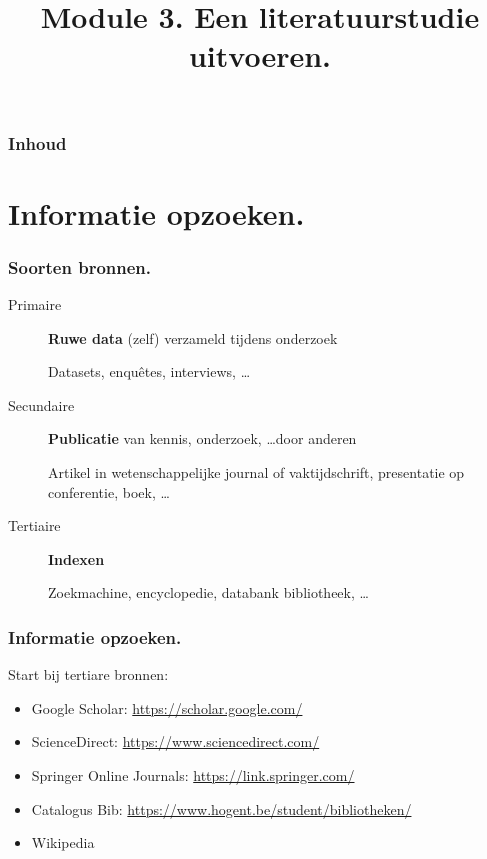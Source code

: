 \documentclass[aspectratio=169]{beamer}
\title{Module 3. Een literatuurstudie uitvoeren.}
\subtitle{\coursename}
\author{\lecturers}   %
\date{\academicyear}
\begin{document}
\begin{frame}
  \maketitle
\end{frame}

\begin{frame}
  \frametitle{Inhoud}

  \tableofcontents
\end{frame}

\section{Informatie opzoeken.}

\begin{frame}
  \frametitle{Soorten bronnen.}

  \begin{description}
    \item[Primaire] \textbf{Ruwe data} (zelf) verzameld tijdens onderzoek

      Datasets, enquêtes, interviews, \ldots

    \item[Secundaire] \textbf{Publicatie} van kennis, onderzoek, \ldots door anderen

      Artikel in wetenschappelijke journal of vaktijdschrift, presentatie op conferentie, boek, \ldots

    \item[Tertiaire] \textbf{Indexen}

      Zoekmachine, encyclopedie, databank bibliotheek, \ldots

  \end{description}

\end{frame}

\begin{frame}
  \frametitle{Informatie opzoeken.}

  Start bij \alert{tertiare} bronnen:

  \begin{itemize}
    \item Google Scholar: \url{https://scholar.google.com/}
    \item ScienceDirect: \url{https://www.sciencedirect.com/}
    \item Springer Online Journals: \url{https://link.springer.com/}
    \item Catalogus Bib: \url{https://www.hogent.be/student/bibliotheken/}
    \item Wikipedia
  \end{itemize}
\end{frame}
\end{document}
